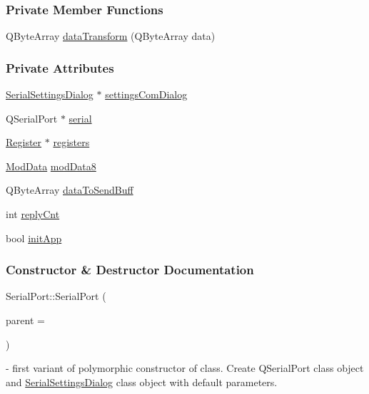 \subsubsection*{Private Member Functions}
\begin{DoxyCompactItemize}
\item 
Q\+Byte\+Array \mbox{\hyperlink{classSerialPort_a8be1b40710483fea19e272b04568f14e}{data\+Transform}} (Q\+Byte\+Array data)
\end{DoxyCompactItemize}
\subsubsection*{Private Attributes}
\begin{DoxyCompactItemize}
\item 
\mbox{\hyperlink{classSerialSettingsDialog}{Serial\+Settings\+Dialog}} $\ast$ \mbox{\hyperlink{classSerialPort_a9ab445f818748122d3368fd2e9dbbbea}{settings\+Com\+Dialog}}
\item 
Q\+Serial\+Port $\ast$ \mbox{\hyperlink{classSerialPort_a54120d9040537e637eae7e8c048dec31}{serial}}
\item 
\mbox{\hyperlink{classRegister}{Register}} $\ast$ \mbox{\hyperlink{classSerialPort_ab98c7d39235d59c2086d9f6e94c3ed4b}{registers}}
\item 
\mbox{\hyperlink{serialport_8h_a2331c0232719069f0bce03c249d2eec6}{Mod\+Data}} \mbox{\hyperlink{classSerialPort_a1fbdedb09ef8f5d7ecb4e43e848d025f}{mod\+Data8}}
\item 
Q\+Byte\+Array \mbox{\hyperlink{classSerialPort_abc55095109004eb5e21e923c25036549}{data\+To\+Send\+Buff}}
\item 
int \mbox{\hyperlink{classSerialPort_a97937bbe34853205cbd02fb5ff97653d}{reply\+Cnt}}
\item 
bool \mbox{\hyperlink{classSerialPort_adf375ee179fa4844cadf65645ee7ab2f}{init\+App}}
\end{DoxyCompactItemize}


\subsubsection{Constructor \& Destructor Documentation}
\mbox{\label{classSerialPort_ae68e4a28e607b4acbab2c2a894cb3e2b}} 
{\footnotesize\ttfamily Serial\+Port\+::\texorpdfstring{Serial\+Port}{SerialPort}{\footnotesize\ttfamily [1/2]} (\begin{DoxyParamCaption}\item[{Q\+Object $\ast$}]{parent = {} }\end{DoxyParamCaption})\hspace{0.3cm}{\ttfamily [explicit]}} - first variant of polymorphic constructor of class. Create Q\+Serial\+Port class object and \hyperlink{classSerialSettingsDialog}{Serial\+Settings\+Dialog} class object with default parameters.

